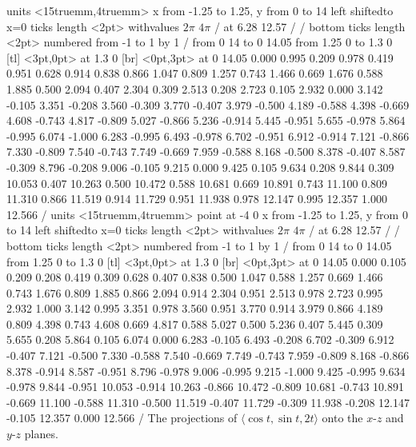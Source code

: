\figure
\texonly
\vbox{\beginpicture
\normalgraphs
\ninepoint
\setcoordinatesystem units <15truemm,4truemm>
\setplotarea x from -1.25 to 1.25, y from 0 to 14
\axis left shiftedto x=0 ticks length <2pt> withvalues {$2\pi$} {$4\pi$} /
  at 6.28 12.57 / /
\axis bottom ticks length <2pt> numbered from -1 to 1 by 1 /
\arrow <4pt> [0.35, 1] from 0 14 to 0 14.05
\arrow <4pt> [0.35, 1] from 1.25 0 to 1.3 0
 [tl] <3pt,0pt> at 1.3 0 
 [br] <0pt,3pt> at 0 14.05 
 0.000 0.995 0.209 0.978 0.419 0.951 0.628 0.914 0.838 0.866
1.047 0.809 1.257 0.743 1.466 0.669 1.676 0.588 1.885 0.500 2.094
0.407 2.304 0.309 2.513 0.208 2.723 0.105 2.932 0.000 3.142 -0.105
3.351 -0.208 3.560 -0.309 3.770 -0.407 3.979 -0.500 4.189 -0.588 4.398
-0.669 4.608 -0.743 4.817 -0.809 5.027 -0.866 5.236 -0.914 5.445
-0.951 5.655 -0.978 5.864 -0.995 6.074 -1.000 6.283 -0.995 6.493
-0.978 6.702 -0.951 6.912 -0.914 7.121 -0.866 7.330 -0.809 7.540
-0.743 7.749 -0.669 7.959 -0.588 8.168 -0.500 8.378 -0.407 8.587
-0.309 8.796 -0.208 9.006 -0.105 9.215 0.000 9.425 0.105 9.634 0.208
9.844 0.309 10.053 0.407 10.263 0.500 10.472 0.588 10.681 0.669 10.891
0.743 11.100 0.809 11.310 0.866 11.519 0.914 11.729 0.951 11.938 0.978
12.147 0.995 12.357 1.000 12.566 /
\setcoordinatesystem units <15truemm,4truemm> point at -4 0
\setplotarea x from -1.25 to 1.25, y from 0 to 14
\axis left shiftedto x=0 ticks length <2pt>  withvalues {$2\pi$} {$4\pi$} /
  at 6.28 12.57 / /
\axis bottom ticks length <2pt> numbered from -1 to 1 by 1 /
\arrow <4pt> [0.35, 1] from 0 14 to 0 14.05
\arrow <4pt> [0.35, 1] from 1.25 0 to 1.3 0
 [tl] <3pt,0pt> at 1.3 0 
 [br] <0pt,3pt> at 0 14.05 
 0.000 0.105 0.209 0.208 0.419 0.309 0.628 0.407 0.838 0.500
 1.047 0.588 1.257 0.669 1.466 0.743 1.676 0.809 1.885 0.866 2.094
 0.914 2.304 0.951 2.513 0.978 2.723 0.995 2.932 1.000 3.142 0.995
 3.351 0.978 3.560 0.951 3.770 0.914 3.979 0.866 4.189 0.809 4.398
 0.743 4.608 0.669 4.817 0.588 5.027 0.500 5.236 0.407 5.445 0.309
 5.655 0.208 5.864 0.105 6.074 0.000 6.283 -0.105 6.493 -0.208 6.702
 -0.309 6.912 -0.407 7.121 -0.500 7.330 -0.588 7.540 -0.669 7.749
 -0.743 7.959 -0.809 8.168 -0.866 8.378 -0.914 8.587 -0.951 8.796
 -0.978 9.006 -0.995 9.215 -1.000 9.425 -0.995 9.634 -0.978 9.844
 -0.951 10.053 -0.914 10.263 -0.866 10.472 -0.809 10.681 -0.743 10.891
 -0.669 11.100 -0.588 11.310 -0.500 11.519 -0.407 11.729 -0.309 11.938
 -0.208 12.147 -0.105 12.357 0.000 12.566 /
\endpicture}
\endtexonly
{}
\begincaption
The projections of $\langle \cos t,\sin
t,2t\rangle$ onto the $x$-$z$ and $y$-$z$ planes.
\endcaption
\endfigure


